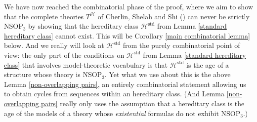 \documentclass{amsart}
\theoremstyle{definition}
\theoremstyle{remark}
\numberwithin{equation}{section}
\begin{document}
We have now reached the combinatorial phase of the proof, where we aim to show that the complete theories $T^{\mathcal{H}}$ of Cherlin, Shelah and Shi (\cite{CSS99}) can never be strictly $\mathrm{NSOP}_{3}$ by showing that the hereditary class $\mathcal{H}^{\mathrm{std}}$ from Lemma \ref{standard hereditary class} cannot exist. This will be Corollary \ref{main combinatorial lemma} below. And we really will look at $\mathcal{H}^{\mathrm{std}}$ from the purely combinatorial point of view: the only part of the conditions on $\mathcal{H}^{\mathrm{std}}$ from Lemma \ref{standard hereditary class} that involves model-theoretic vocabulary is that $\mathcal{H}^{\mathrm{std}}$ is the age of a structure whose theory is $\mathrm{NSOP}_{3}$. Yet what we use about this is the above Lemma \ref{non-overlapping pairs}, an entirely combinatorial statement allowing us to obtain cycles from sequences within an hereditary class. (And Lemma \ref{non-overlapping pairs} really only uses the assumption that a hereditary class is the age of the models of a theory whose \textit{existential} formulas do not exhibit $\mathrm{NSOP}_{3}$.)
\end{document}
